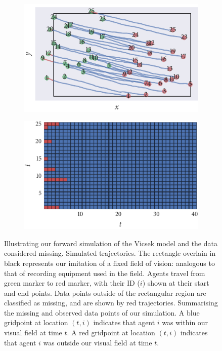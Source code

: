 \begin{figure}[tbp]
  \begin{subfigure}[b]{0.5\textwidth}
    \includegraphics{beg/data.pdf}
    \caption{}
    \label{subfig:beg_data}
  \end{subfigure}%
  \begin{subfigure}[b]{0.5\textwidth}
    \includegraphics{beg/missing_array.pdf}
    \caption{}
    \label{subfig:beg_missing}
  \end{subfigure}
  \caption{Illustrating our forward simulation of the Vicsek model and the
    data considered missing.  Simulated trajectories.
    The rectangle overlain in black represents our imitation of a fixed
    field of vision: analogous to that of recording equipment used in the
    field. Agents travel from green marker to red marker, with their ID ($i$)
    shown at their start and end points. Data points outside of the rectangular
    region are classified as missing, and are shown by red trajectories.
     Summarising the missing and observed data
    points of our simulation. A blue gridpoint at location $(t, i)$ indicates
    that agent $i$ was within our visual field at time $t$. A red gridpoint at
    location $(t, i)$ indicates that agent $i$ was outside our visual field
    at time $t$.}
  \label{fig:beg_data}
\end{figure}

